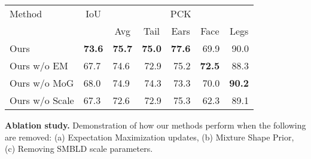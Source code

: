 \small
\centering
\begin{tabular}{@{}lllrrrr@{}}
\toprule
\multicolumn{1}{l}{Method} & 
\multicolumn{1}{c}{IoU} & 
\multicolumn{5}{c}{PCK} \\
\multicolumn{2}{c}{} &
\multicolumn{1}{c}{Avg} &
\multicolumn{1}{c}{Tail} &
\multicolumn{1}{c}{Ears} &
\multicolumn{1}{c}{Face} &
\multicolumn{1}{c}{Legs} \\
\midrule
Ours & \textbf{73.6} & \textbf{75.7} & \textbf{75.0} & \textbf{77.6} & 69.9 & 90.0 \\
Ours w/o EM & 67.7 & 74.6 & 72.9 & 75.2 & \textbf{72.5} & 88.3 \\
Ours w/o MoG & 68.0 & 74.9 & 74.3 & 73.3 & 70.0 & \textbf{90.2} \\ 
Ours w/o Scale & 67.3 & 72.6 & 72.9 & 75.3 & 62.3 & 89.1 \\
\bottomrule 
\end{tabular}
\vspace{1em}
\caption{\label{tab:ablation}\textbf{Ablation study.} Demonstration of how our methods perform when the following are removed: (a) Expectation Maximization updates, (b) Mixture Shape Prior, (c) Removing SMBLD scale parameters.}
